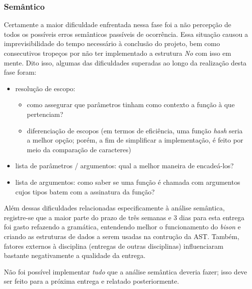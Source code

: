 \documentclass[
	article,			%
	11pt,				%
	oneside,			%
	a4paper,			%
	english,			%
	brazil,				%
	sumario=tradicional
	]{abntex2}
\renewcommand{\it}[1]{\textit{#1}}
\begin{document}
\subsubsection{Semântico}
\label{semantico}

Certamente a maior dificuldade enfrentada nessa fase foi a não percepção de todos os possíveis erros semânticos passíveis de ocorrência. Essa situação causou a imprevisibilidade do tempo necessário à conclusão do projeto, bem como consecutivos tropeços por não ter implementado a estrutura \it{No} com isso em mente. Dito isso, algumas das dificuldades superadas ao longo da realização desta fase foram:
\begin{itemize}
	\item resolução de escopo:
		\begin{itemize}
			\item como assegurar que parâmetros tinham como contexto a função à que pertenciam?
			\item diferenciação de escopos (em termos de eficiência, uma função \it{hash} seria a melhor opção; porém, a fim de simplificar a implementação, é feito por meio da comparação de caracteres)
		\end{itemize}	 
	\item lista de parâmetros / argumentos: qual a melhor maneira de encadeá-los?
	\item lista de argumentos: como saber se uma função é chamada com argumentos cujos tipos batem com a assinatura da função?	
\end{itemize}

Além dessas dificuldades relacionadas especificamente à análise semântica, registre-se que a maior parte do prazo de três semanas e 3 dias para esta entrega foi gasto refazendo a gramática, entendendo melhor o funcionamento do \it{bison} e criando as estruturas de dados a serem usadas na contrução da AST. Também,
fatores externos à disciplina (entregas de outras disciplinas) influenciaram bastante negativamente a
qualidade da entrega.

Não foi possível implementar \it{tudo} que a análise semântica deveria fazer; isso deve ser feito para a próxima entrega e relatado posteriormente.
\end{document}
